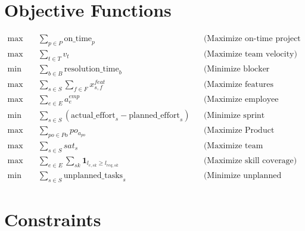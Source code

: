 \documentclass{article}
\begin{document}
\section*{Objective Functions}
\begin{align}
\max \quad & \sum_{p \in P} \text{on\_time}_p && \text{(Maximize on-time project completion)} \\
\max \quad & \sum_{t \in T} v_t && \text{(Maximize team velocity)} \\
\min \quad & \sum_{b \in B} \text{resolution\_time}_b && \text{(Minimize blocker resolution time)} \\
\max \quad & \sum_{s \in S} \sum_{f \in F} x^{feat}_{s,f} && \text{(Maximize features delivered)} \\
\max \quad & \sum_{e \in E} a^{emp}_e && \text{(Maximize employee availability)} \\
\min \quad & \sum_{s \in S} (\text{actual\_effort}_s - \text{planned\_effort}_s) && \text{(Minimize sprint overruns)} \\
\max \quad & \sum_{po \in Po} po_a_{po} && \text{(Maximize Product Owner involvement)} \\
\max \quad & \sum_{s \in S} sat_s && \text{(Maximize team satisfaction)} \\
\max \quad & \sum_{e \in E} \sum_{sk} \mathbf{1}_{l_{e,sk} \geq l_{req,sk}} && \text{(Maximize skill coverage)} \\
\min \quad & \sum_{s \in S} \text{unplanned\_tasks}_s && \text{(Minimize unplanned work)}
\end{align}

\section*{Constraints}
\end{document}
